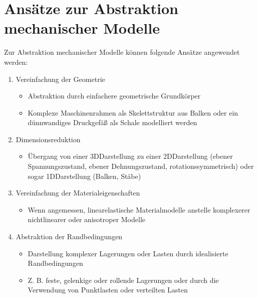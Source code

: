 \documentclass[letterpaper,10pt,german]{jupyterBook}
\begin{document}
\section{Ansätze zur Abstraktion mechanischer Modelle}
\label{\detokenize{chapters/chapter1/Einf_xfchrung_Konstruktion:ansatze-zur-abstraktion-mechanischer-modelle}}
\sphinxAtStartPar
Zur Abstraktion mechanischer Modelle können folgende Ansätze angewendet werden:
\begin{enumerate}
%
\item {} 
\sphinxAtStartPar
Vereinfachung der Geometrie
\begin{itemize}
\item {} 
\sphinxAtStartPar
Abstraktion durch einfachere geometrische Grundkörper

\item {} 
\sphinxAtStartPar
Komplexe Maschinenrahmen als Skelettstruktur aus Balken oder ein dünnwandiges Druckgefäß als Schale modelliert werden

\end{itemize}

\item {} 
\sphinxAtStartPar
Dimensionsreduktion
\begin{itemize}
\item {} 
\sphinxAtStartPar
Übergang von einer 3D\sphinxhyphen{}Darstellung zu einer 2D\sphinxhyphen{}Darstellung (ebener Spannungszustand, ebener Dehnungszustand, rotationssymmetrisch) oder sogar 1D\sphinxhyphen{}Darstellung (Balken, Stäbe)

\end{itemize}

\item {} 
\sphinxAtStartPar
Vereinfachung der Materialeigenschaften
\begin{itemize}
\item {} 
\sphinxAtStartPar
Wenn angemessen, linear\sphinxhyphen{}elastische Materialmodelle anstelle komplexerer nichtlinearer oder anisotroper Modelle

\end{itemize}

\item {} 
\sphinxAtStartPar
Abstraktion der Randbedingungen
\begin{itemize}
\item {} 
\sphinxAtStartPar
Darstellung komplexer Lagerungen oder Lasten durch idealisierte Randbedingungen

\item {} 
\sphinxAtStartPar
Z. B. feste, gelenkige oder rollende Lagerungen oder durch die Verwendung von Punktlasten oder verteilten Lasten


\end{itemize}
\end{enumerate}
\end{document}
